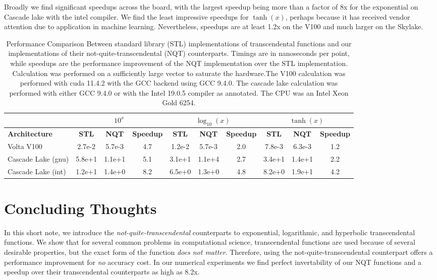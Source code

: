 \documentclass[a4paper,fleqn]{cas-sc}
\begin{document}
Broadly we find significant speedups across the board, with the
largest speedup being more than a factor of 8x for the exponential on
Cascade lake with the intel compiler. We find the least impressive
speedups for $\tanh(x)$, perhaps because it has received vendor
attention due to application in machine learning. Nevertheless,
speedups are at least 1.2x on the V100 and much larger on the Skylake.

\begin{table}
  \label{tab:results}
  \caption{Performance Comparison Between standard library (STL)
    implementations of transcendental functions and our
    implementations of their not-quite-transcendental (NQT)
    counterparts. Timings are in nanoseconds per point, while speedups
    are the performance improvement of the NQT implementation over the
    STL implementation. Calculation was performed on a sufficiently
    large vector to saturate the hardware.The V100 calculation was
    performed with cuda 11.4.2 with the GCC backend using GCC
    9.4.0. The cascade lake calculation was performed with either GCC
    9.4.0 or with the Intel 19.0.5 compiler as annotated. The CPU was
    an Intel Xeon Gold 6254.}
  \begin{tabular*}{\tblwidth}{l | c | c | c| c | c | c | c | c | c}
    \toprule
    {} &\multicolumn{3}{c}{$10^x$}&\multicolumn{3}{c}{$\log_{10}(x)$}&\multicolumn{3}{c}{$\tanh(x)$}\\
    \midrule
    \textbf{Architecture} & \textbf{STL} & \textbf{NQT} & \textbf{Speedup} & \textbf{STL} & \textbf{NQT} & \textbf{Speedup} & \textbf{STL} & \textbf{NQT} & \textbf{Speedup}\\
    \midrule
    Volta V100
       & 2.7e-2 & 5.7e-3 & 4.7 & 1.2e-2 & 5.7e-3 & 2.0 & 7.8e-3 & 6.3e-3 & 1.2\\
    \midrule
    Cascade Lake (gnu)
       & 5.8e+1 & 1.1e+1 & 5.1 & 3.1e+1 & 1.1e+4 & 2.7 & 3.4e+1 & 1.4e+1 & 2.2\\
    \midrule
    Cascade Lake (int)
       & 1.2e+1 & 1.4e+0 & 8.2 & 6.5e+0 & 1.3e+0 & 4.8 & 8.2e+0 & 1.9e+1 & 4.2\\
    \bottomrule
  \end{tabular*}
\end{table}

\section{Concluding Thoughts}
\label{sec:concluding:thoughts}

In this short note, we introduce the \textit{not-quite-transcendental}
counterparts to exponential, logarithmic, and hyperbolic
transcendental functions. We show that for several common problems in
computational science, transcendental functions are used because of
several desirable properties, but the exact form of the function
\textit{does not matter}. Therefore, using the
not-quite-transcendental counterpart offers a performance improvement
for \textit{no} accuracy cost. In our numerical experiments we find
perfect invertability of our NQT functions and a speedup over their
transcendental counterparts as high as 8.2x.
\end{document}
